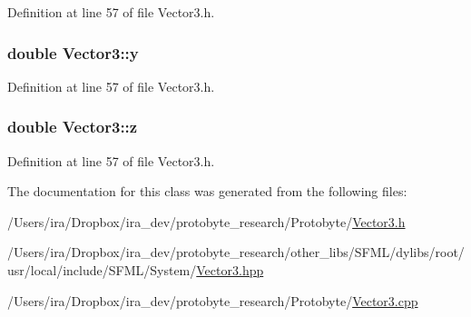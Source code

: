 Definition at line 57 of file Vector3.\-h.

\hypertarget{class_vector3_ae4965693beffdb6069e0618222cae459}{
\subsubsection[{y}]{\setlength{\rightskip}{0pt plus 5cm}double Vector3\-::y}}\label{class_vector3_ae4965693beffdb6069e0618222cae459}


Definition at line 57 of file Vector3.\-h.

\hypertarget{class_vector3_aa5f4108b2839a110eeaec8606780eaff}{
\subsubsection[{z}]{\setlength{\rightskip}{0pt plus 5cm}double Vector3\-::z}}\label{class_vector3_aa5f4108b2839a110eeaec8606780eaff}


Definition at line 57 of file Vector3.\-h.



The documentation for this class was generated from the following files\-:\begin{DoxyCompactItemize}
\item 
/\-Users/ira/\-Dropbox/ira\-\_\-dev/protobyte\-\_\-research/\-Protobyte/\hyperlink{_vector3_8h}{Vector3.\-h}\item 
/\-Users/ira/\-Dropbox/ira\-\_\-dev/protobyte\-\_\-research/other\-\_\-libs/\-S\-F\-M\-L/dylibs/root/usr/local/include/\-S\-F\-M\-L/\-System/\hyperlink{_vector3_8hpp}{Vector3.\-hpp}\item 
/\-Users/ira/\-Dropbox/ira\-\_\-dev/protobyte\-\_\-research/\-Protobyte/\hyperlink{_vector3_8cpp}{Vector3.\-cpp}\end{DoxyCompactItemize}
